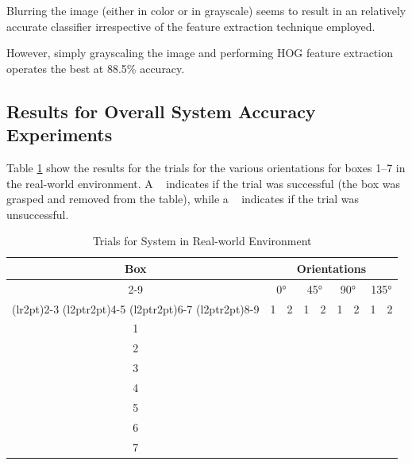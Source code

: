 \documentclass[letterpaper, 10 pt, conference]{conf/ieeeconf}  %
\newcommand{\cmark}{\ding{51}}%
\newcommand{\xmark}{\ding{55}}%
\begin{document}
Blurring the image (either in color or in grayscale) seems to result in an
relatively accurate classifier irrespective of the feature extraction technique
employed.

However, simply grayscaling the image and performing HOG feature
extraction operates the best at 88.5\% accuracy.

\subsection{Results for Overall System Accuracy Experiments}

Table \ref{tab:trials_real_world} show the results for the trials for the
various orientations for boxes 1--7 in the real-world environment. A \cmark~
indicates if the trial was successful (the box was grasped and removed from the
table), while a \xmark~ indicates if the trial was unsuccessful.
\begin{table}[H]
  \centering
  \begin{tabular}{c c c c c c c c c}
    \toprule
    \multirow{4}{*}[-0.5\dimexpr \aboverulesep + \belowrulesep + \cmidrulewidth]{Box} & \multicolumn{8}{c}{Orientations}\\
    \cmidrule(rl){2-9}
                                                                                      & \multicolumn{2}{c}{\ang{0}} & \multicolumn{2}{c}{\ang{45}} & \multicolumn{2}{c}{\ang{90}} & \multicolumn{2}{c}{\ang{135}} \\
    \cmidrule(lr{2pt}){2-3}
    \cmidrule(l{2pt}r{2pt}){4-5}
    \cmidrule(l{2pt}r{2pt}){6-7}
    \cmidrule(l{2pt}r{2pt}){8-9}
                                                                                      & 1      & 2      & 1      & 2      &  1     & 2      &  1     &  2     \\
    \midrule
    1 & \cmark & \cmark & \cmark & \cmark & \cmark & \cmark & \cmark & \cmark \\
    2 & \cmark & \cmark & \cmark & \cmark & \cmark & \cmark & \cmark & \cmark \\
    3 & \cmark & \cmark & \cmark & \cmark & \cmark & \cmark & \cmark & \cmark \\
    4 & \cmark & \cmark & \cmark & \cmark & \cmark & \cmark & \cmark & \cmark \\
    5 & \cmark & \cmark & \cmark & \cmark & \cmark & \cmark & \cmark & \cmark \\
    6 & \cmark & \cmark & \cmark & \cmark & \cmark & \cmark & \cmark & \cmark \\
    7 & \cmark & \cmark & \cmark & \cmark & \cmark & \cmark & \cmark & \cmark \\
    \bottomrule
  \end{tabular}
  \caption{Trials for System in Real-world Environment}
  \label{tab:trials_real_world}
\end{table}
\end{document}
